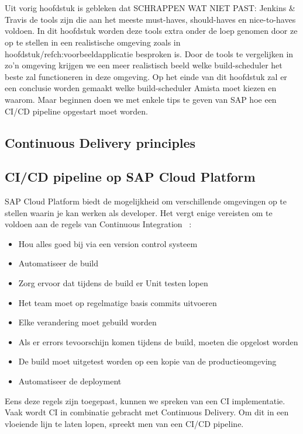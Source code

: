 
\chapter{}
\label{ch:proof-of-concept}
Uit vorig hoofdstuk is gebleken dat SCHRAPPEN WAT NIET PAST: Jenkins \& Travis de tools zijn die aan het meeste must-haves, should-haves en nice-to-haves voldoen. In dit hoofdstuk worden deze tools extra onder de loep genomen door ze op te stellen in een realistische omgeving zoals in hoofdstuk/ref{ch:voorbeeldapplicatie} besproken is. Door de tools te vergelijken in zo'n omgeving krijgen we een meer realistisch beeld welke build-scheduler het beste zal functioneren in deze omgeving. Op het einde van dit hoofdstuk zal er een conclusie worden gemaakt welke build-scheduler Amista moet kiezen en waarom. Maar beginnen doen we met enkele tips te geven van SAP hoe een CI/CD pipeline opgestart moet worden.

\section{Continuous Delivery principles}
\label{sec:continuous-delivery-principles}

\section{CI/CD pipeline op SAP Cloud Platform}
\label{sec:ci-cd-op-sap-cloud-platform}
SAP Cloud Platform biedt de mogelijkheid om verschillende omgevingen op te stellen waarin je kan werken als developer. Het vergt enige vereisten om te voldoen aan de regels van Continuous Integration ~\autocite{Kramer2018}:
\begin{itemize}
    \item Hou alles goed bij via een version control systeem
    \item Automatiseer de build
    \item Zorg ervoor dat tijdens de build er Unit testen lopen
    \item Het team moet op regelmatige basis commits uitvoeren
    \item Elke verandering moet gebuild worden
    \item Als er errors tevoorschijn komen tijdens de build, moeten die opgelost worden
    \item De build moet uitgetest worden op een kopie van de productieomgeving
    \item Automatiseer de deployment
\end{itemize}
Eens deze regels zijn toegepast, kunnen we spreken van een CI implementatie.
Vaak wordt CI in combinatie gebracht met Continuous Delivery. Om dit in een vloeiende lijn te laten lopen, spreekt men van een CI/CD pipeline.

